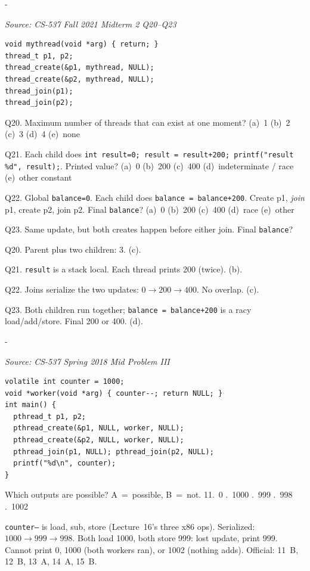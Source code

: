 \documentclass[11pt,a4paper]{article}
\makeatletter
\newcommand{\keepspace}[1]{\par\penalty-100\begingroup
  \setlength{\dimen@}{#1}\dimen@ii\pagegoal\advance\dimen@ii-\pagetotal
  \ifdim\dimen@>\dimen@ii\ifdim\dimen@ii>\z@\vfil\fi\break\fi\endgroup}
\newcounter{qn}[section]
\newenvironment{Qn}[4]{%
  \refstepcounter{qn}\keepspace{7\baselineskip}%
  \begin{tcolorbox}[qboxstyle, title={Q\thesection.\theqn\ \ [#1 \textbar\ #2]\ \ #4}]%
  {\footnotesize\color{g3}\textit{Source: #3}}\par\smallskip%
}{%
  \end{tcolorbox}%
}
\newenvironment{Sol}{%
  \begin{tcolorbox}[sboxstyle, title={Solution}]%
}{%
  \end{tcolorbox}\vspace{0.35em}%
}
\makeatother
\begin{document}
\begin{Qn}{Easy-Medium}{Lect 16}{CS-537 Fall 2021 Midterm 2 Q20--Q23}{How many threads, and is \texttt{balance} racy?}
\begin{lstlisting}[numbers=none]
void mythread(void *arg) { return; }
thread_t p1, p2;
thread_create(&p1, mythread, NULL);
thread_create(&p2, mythread, NULL);
thread_join(p1);
thread_join(p2);
\end{lstlisting}

Q20. Maximum number of threads that can exist at one moment?
(a)~1 (b)~2 (c)~3 (d)~4 (e)~none

Q21. Each child does \texttt{int result=0; result = result+200; printf("result \%d", result);}. Printed value?
(a)~0 (b)~200 (c)~400 (d)~indeterminate / race (e)~other constant

Q22. Global \texttt{balance=0}. Each child does \texttt{balance = balance+200}. Create p1, \emph{join} p1, create p2, join p2. Final \texttt{balance}?
(a)~0 (b)~200 (c)~400 (d)~race (e)~other

Q23. Same update, but both creates happen before either join. Final \texttt{balance}?
\end{Qn}
\begin{Sol}
Q20. Parent plus two children: 3. (c).

Q21. \texttt{result} is a stack local. Each thread prints 200 (twice). (b).

Q22. Joins serialize the two updates: $0\to200\to400$. No overlap. (c).

Q23. Both children run together; \texttt{balance = balance+200} is a racy load/add/store. Final 200 or 400. (d).
\end{Sol}

\begin{Qn}{Easy-Medium}{Lect 16}{CS-537 Spring 2018 Mid Problem III}{Two workers decrement a counter}
\begin{lstlisting}[numbers=none]
volatile int counter = 1000;
void *worker(void *arg) { counter--; return NULL; }
int main() {
  pthread_t p1, p2;
  pthread_create(&p1, NULL, worker, NULL);
  pthread_create(&p2, NULL, worker, NULL);
  pthread_join(p1, NULL); pthread_join(p2, NULL);
  printf("%d\n", counter);
}
\end{lstlisting}

Which outputs are possible? A~=~possible, B~=~not.
11.~0 .~1000 .~999 .~998 .~1002
\end{Qn}
\begin{Sol}
\texttt{counter--} is load, sub, store (Lecture~16's three x86 ops). Serialized: $1000\to999\to998$. Both load 1000, both store 999: lost update, print 999. Cannot print 0, 1000 (both workers ran), or 1002 (nothing adds). Official: 11~B, 12~B, 13~A, 14~A, 15~B.
\end{Sol}
\end{document}
